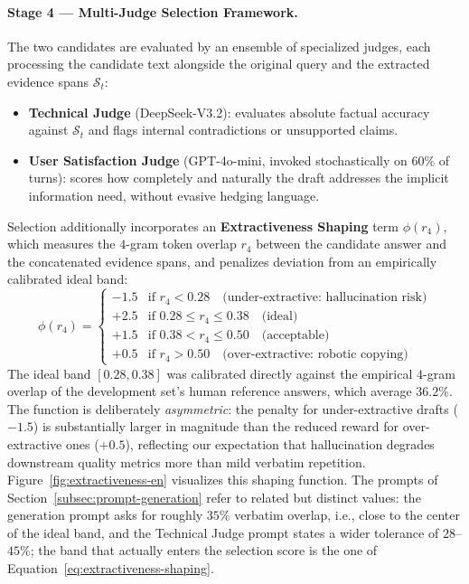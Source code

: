 \paragraph{Stage 4 --- Multi-Judge Selection Framework.}
The two candidates are evaluated by an ensemble of specialized judges, each processing the candidate text alongside the original query and the extracted evidence spans $\mathcal{S}_t$:
\begin{itemize}
    \item \textbf{Technical Judge} (DeepSeek-V3.2): evaluates absolute factual accuracy against $\mathcal{S}_t$ and flags internal contradictions or unsupported claims.
    \item \textbf{User Satisfaction Judge} (GPT-4o-mini, invoked stochastically on $60\%$ of turns): scores how completely and naturally the draft addresses the implicit information need, without evasive hedging language.
\end{itemize}
Selection additionally incorporates an \textbf{Extractiveness Shaping} term $\phi(r_4)$, which measures the $4$-gram token overlap $r_4$ between the candidate answer and the concatenated evidence spans, and penalizes deviation from an empirically calibrated ideal band:
\begin{equation}
\phi(r_4) =
\begin{cases}
-1.5 & \text{if } r_4 < 0.28 \quad \text{(under-extractive: hallucination risk)} \\
+2.5 & \text{if } 0.28 \leq r_4 \leq 0.38 \quad \text{(ideal)} \\
+1.5 & \text{if } 0.38 < r_4 \leq 0.50 \quad \text{(acceptable)} \\
+0.5 & \text{if } r_4 > 0.50 \quad \text{(over-extractive: robotic copying)}
\end{cases}
\label{eq:extractiveness-shaping}
\end{equation}
The ideal band $[0.28, 0.38]$ was calibrated directly against the empirical $4$-gram overlap of the development set's human reference answers, which average $36.2\%$. The function is deliberately \emph{asymmetric}: the penalty for under-extractive drafts ($-1.5$) is substantially larger in magnitude than the reduced reward for over-extractive ones ($+0.5$), reflecting our expectation that hallucination degrades downstream quality metrics more than mild verbatim repetition. Figure~\ref{fig:extractiveness-en} visualizes this shaping function. The prompts of Section~\ref{subsec:prompt-generation} refer to related but distinct values: the generation prompt asks for roughly $35\%$ verbatim overlap, i.e., close to the center of the ideal band, and the Technical Judge prompt states a wider tolerance of $28$--$45\%$; the band that actually enters the selection score is the one of Equation~\eqref{eq:extractiveness-shaping}.

